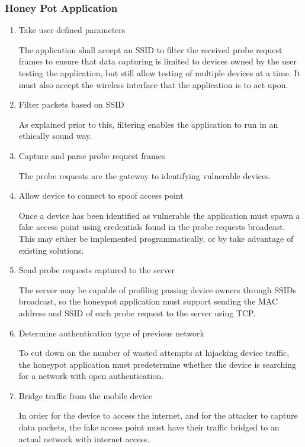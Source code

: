 \label{requirements:specific}
\subsubsection{Honey Pot Application}
\begin{enumerate}
\item Take user defined parameters

The application shall accept an SSID to filter the received probe request frames to ensure that data capturing is limited to devices owned by the user testing the application, but still allow testing of multiple devices at a time. It must also accept the wireless interface that the application is to act upon.

\item Filter packets based on SSID

As explained prior to this, filtering enables the application to run in an ethically sound way.

\item Capture and parse probe request frames

The probe requests are the gateway to identifying vulnerable devices.

\item Allow device to connect to spoof access point

Once a device has been identified as vulnerable the application must spawn a fake access point using credentials found in the probe requests broadcast. This may either be implemented programmatically, or by take advantage of existing solutions.

\item Send probe requests captured to the server

The server may be capable of profiling passing device owners through SSIDs broadcast, so the honeypot application must support sending the MAC address and SSID of each probe request to the server using TCP.

\item Determine authentication type of previous network

To cut down on the number of wasted attempts at hijacking device traffic, the honeypot application must predetermine whether the device is searching for a network with open authentication.

\item  Bridge traffic from the mobile device

In order for the device to access the internet, and for the attacker to capture data packets, the fake access point must have their traffic bridged to an actual network with internet access.
\end{enumerate}
